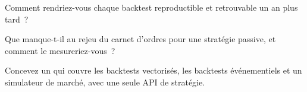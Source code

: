 \begin{interviewq}\label{iq:pl:backtest-engine-architecture:3}
Comment rendriez-vous chaque backtest reproductible et retrouvable un an plus tard~?
\end{interviewq}

\begin{interviewq}\label{iq:pl:backtest-engine-architecture:4}
Que manque-t-il au rejeu du carnet d'ordres pour une stratégie passive, et comment le mesureriez-vous~?
\end{interviewq}

\begin{interviewq}\label{iq:pl:backtest-engine-architecture:5}
Concevez un  qui couvre les backtests vectorisés, les backtests événementiels et un simulateur de marché, avec une seule API de stratégie.
\end{interviewq}
